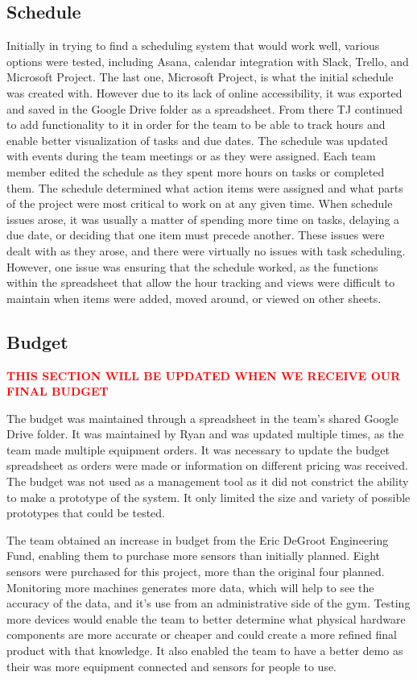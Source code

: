 \documentclass[PPFS.tex]{template/subfiles}
\begin{document}
    \subsection{Schedule}
	Initially in trying to find a scheduling system that would work well, various options were tested, including Asana, calendar integration with Slack, Trello, and Microsoft Project. The last one, Microsoft Project, is what the initial schedule was created with. However due to its lack of online accessibility, it was exported and saved in the Google Drive folder as a spreadsheet. From there TJ continued to add functionality to it in order for the team to be able to track hours and enable better visualization of tasks and due dates. The schedule was updated with events during the team meetings or as they were assigned. Each team member edited the schedule as they spent more hours on tasks or completed them. The schedule determined what action items were assigned and what parts of the project were most critical to work on at any given time. When schedule issues arose, it was usually a matter of spending more time on tasks, delaying a due date, or deciding that one item must precede another. These issues were dealt with as they arose, and there were virtually no issues with task scheduling. However, one issue was ensuring that the schedule worked, as the functions within the spreadsheet that allow the hour tracking and views were difficult to maintain when items were added, moved around, or viewed on other sheets.
	
    \subsection{Budget}
    
    \textcolor{red}{\textbf{THIS SECTION WILL BE UPDATED WHEN WE RECEIVE OUR FINAL BUDGET}}
    
    The budget was maintained through a spreadsheet in the team's shared Google Drive folder. It was maintained by Ryan and was updated multiple times, as the team made multiple equipment orders. It was necessary to update the budget spreadsheet as orders were made or information on different pricing was received. The budget was not used as a management tool as it did not constrict the ability to make a prototype of the system. It only limited the size and variety of possible prototypes that could be tested.
    
    The team obtained an increase in budget from the Eric DeGroot Engineering Fund, enabling them to purchase more sensors than initially planned. Eight sensors were purchased for this project, more than the original four planned. Monitoring more machines generates more data, which will help to see the accuracy of the data, and it's use from an administrative side of the gym. Testing more devices would enable the team to better determine what physical hardware components are more accurate or cheaper and could create a more refined final product with that knowledge. It also enabled the team to have a better demo as their was more equipment connected and sensors for people to use. 
    
\end{document}
